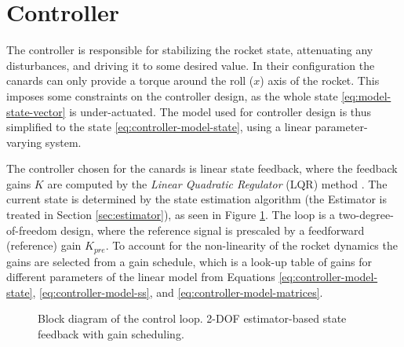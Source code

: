 \section{Controller}
The controller is responsible for stabilizing the rocket state, attenuating any disturbances, and driving it to some desired value.
In their configuration the canards can only provide a torque around the roll ($x$) axis of the rocket.
This imposes some constraints on the controller design, as the whole state \ref{eq:model-state-vector} is under-actuated.
The model used for controller design is thus simplified to the state \ref{eq:controller-model-state}, using a linear parameter-varying system.

The controller chosen for the canards is linear state feedback, where the feedback gains $K$ are computed by the \textit{Linear Quadratic Regulator} (LQR) method \cite{werner2021, werner2021b}.
The current state is determined by the state estimation algorithm (the Estimator is treated in Section \ref{sec:estimator}), as seen in Figure \ref{fig:controller-loop}.
The loop is a two-degree-of-freedom design, where the reference signal is prescaled by a feedforward (reference) gain $K_{pre}$.
To account for the non-linearity of the rocket dynamics the gains are selected from a gain schedule, which is a look-up table of gains for different parameters of the linear model from Equations \ref{eq:controller-model-state}, 
\ref{eq:controller-model-ss}, and \ref{eq:controller-model-matrices}. 

\begin{figure}[ht]
    \centering
    \resizebox{0.8\textwidth}{!}{
    }
    \caption[Block diagram of the control loop]{Block diagram of the control loop. 2-DOF estimator-based state feedback \cite{werner2021} with gain scheduling.}
    \label{fig:controller-loop}
\end{figure}


